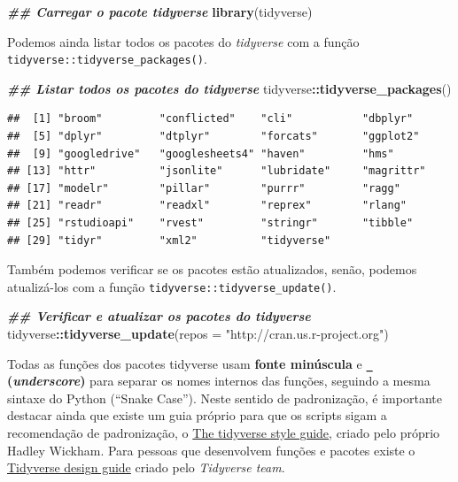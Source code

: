 \documentclass[
]{article}
\newenvironment{Shaded}{\begin{snugshade}}{\end{snugshade}}
\newcommand{\AttributeTok}[1]{\textcolor[rgb]{0.13,0.29,0.53}{#1}}
\newcommand{\DocumentationTok}[1]{\textcolor[rgb]{0.56,0.35,0.01}{\textbf{\textit{#1}}}}
\newcommand{\FunctionTok}[1]{\textcolor[rgb]{0.13,0.29,0.53}{\textbf{#1}}}
\newcommand{\NormalTok}[1]{#1}
\newcommand{\SpecialCharTok}[1]{\textcolor[rgb]{0.81,0.36,0.00}{\textbf{#1}}}
\newcommand{\StringTok}[1]{\textcolor[rgb]{0.31,0.60,0.02}{#1}}
\begin{document}
\begin{Shaded}
\begin{Highlighting}[]
\DocumentationTok{\#\# Carregar o pacote tidyverse}
\FunctionTok{library}\NormalTok{(tidyverse)}
\end{Highlighting}
\end{Shaded}

Podemos ainda listar todos os pacotes do \emph{tidyverse} com a função \texttt{tidyverse::tidyverse\_packages()}.

\begin{Shaded}
\begin{Highlighting}[]
\DocumentationTok{\#\# Listar todos os pacotes do tidyverse }
\NormalTok{tidyverse}\SpecialCharTok{::}\FunctionTok{tidyverse\_packages}\NormalTok{()}
\end{Highlighting}
\end{Shaded}

\begin{verbatim}
##  [1] "broom"         "conflicted"    "cli"           "dbplyr"       
##  [5] "dplyr"         "dtplyr"        "forcats"       "ggplot2"      
##  [9] "googledrive"   "googlesheets4" "haven"         "hms"          
## [13] "httr"          "jsonlite"      "lubridate"     "magrittr"     
## [17] "modelr"        "pillar"        "purrr"         "ragg"         
## [21] "readr"         "readxl"        "reprex"        "rlang"        
## [25] "rstudioapi"    "rvest"         "stringr"       "tibble"       
## [29] "tidyr"         "xml2"          "tidyverse"
\end{verbatim}

Também podemos verificar se os pacotes estão atualizados, senão, podemos atualizá-los com a função \texttt{tidyverse::tidyverse\_update()}.

\begin{Shaded}
\begin{Highlighting}[]
\DocumentationTok{\#\# Verificar e atualizar os pacotes do tidyverse }
\NormalTok{tidyverse}\SpecialCharTok{::}\FunctionTok{tidyverse\_update}\NormalTok{(}\AttributeTok{repos =} \StringTok{"http://cran.us.r{-}project.org"}\NormalTok{)}
\end{Highlighting}
\end{Shaded}

Todas as funções dos pacotes tidyverse usam \textbf{fonte minúscula} e \textbf{\texttt{\_} (\emph{underscore})} para separar os nomes internos das funções, seguindo a mesma sintaxe do Python (``Snake Case''). Neste sentido de padronização, é importante destacar ainda que existe um guia próprio para que os scripts sigam a recomendação de padronização, o \href{https://style.tidyverse.org/}{The tidyverse style guide}, criado pelo próprio Hadley Wickham. Para pessoas que desenvolvem funções e pacotes existe o \href{https://design.tidyverse.org/}{Tidyverse design guide} criado pelo \emph{Tidyverse team}.
\end{document}
